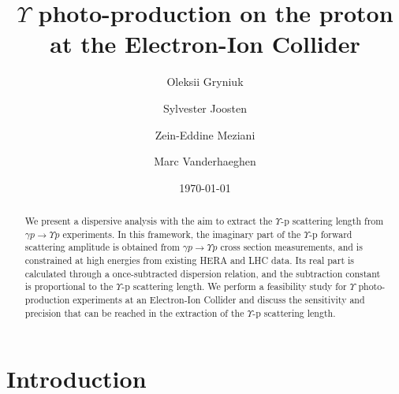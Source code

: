 \documentclass[prd,amsmath,twocolumn,floatfix,amssymb, preprintnumbers, linenumbers,nofootinbib, superscriptaddress]{revtex4}
\begin{document}
\title{$\Upsilon$ photo-production on the proton at the Electron-Ion Collider}
\author{Oleksii Gryniuk}
\author{Sylvester Joosten}
\author{Zein-Eddine Meziani}
\author{Marc Vanderhaeghen}
\noaffiliation
\date{\today}

\begin{abstract}

We present a dispersive analysis with the aim to extract the $\Upsilon$-p scattering length from $\gamma p \to \Upsilon p$ experiments. In this framework, the imaginary part of the $\Upsilon$-p forward scattering amplitude is obtained from $\gamma p \to \Upsilon p$ cross section measurements, and is constrained at high energies from existing HERA and LHC data. Its real part is calculated through a once-subtracted dispersion relation, and    
the subtraction constant is proportional to the $\Upsilon$-p scattering length. We perform a feasibility study for $\Upsilon$ photo-production experiments at an Electron-Ion Collider and discuss the sensitivity and precision that can be reached in the extraction of the $\Upsilon$-p scattering length. 

\end{abstract}

\maketitle



\section{Introduction}
\end{document}
